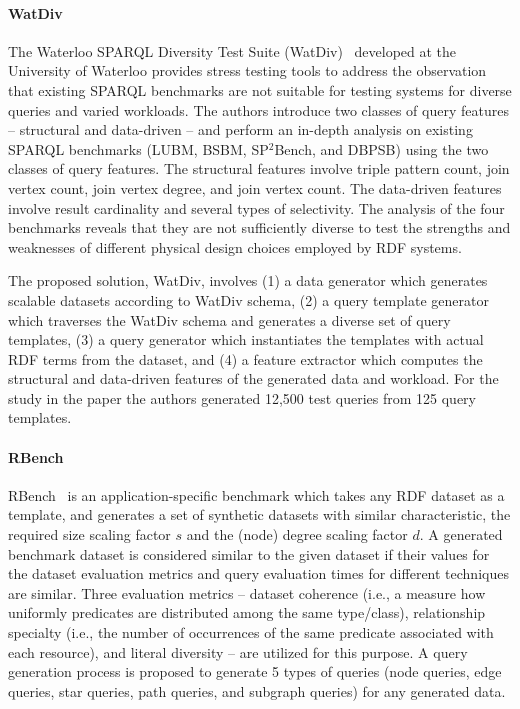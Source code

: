 \paragraph{WatDiv} The Waterloo SPARQL Diversity Test Suite (WatDiv)~\cite{Aluc:2014:DST:2717213.2717229} developed at the University of Waterloo provides stress testing tools to address the observation that existing SPARQL benchmarks are not suitable for testing systems for diverse queries and varied workloads. The authors introduce two classes of query features -- structural and data-driven -- and perform an in-depth analysis on existing SPARQL benchmarks (LUBM, BSBM, SP$^2$Bench, and DBPSB) using the two classes of query features. The structural features involve triple pattern count, join vertex count, join vertex degree, and join vertex count. The data-driven features involve result cardinality and several types of selectivity. The analysis of the four benchmarks reveals that they are not sufficiently diverse to test the strengths and weaknesses of different physical design choices employed by RDF systems.

The proposed solution, WatDiv, involves (1) a data generator which generates scalable datasets according to WatDiv schema, (2) a query template generator which traverses the WatDiv schema and generates a diverse set of query templates, (3) a query generator which instantiates the templates with actual RDF terms from the dataset, and (4) a feature extractor which computes the structural and data-driven features of the generated data and workload. For the study in the paper the authors generated 12,500 test queries from 125 query templates.

\paragraph{RBench} RBench~\cite{Qiao:2015:RAR:2723372.2746479} is an application-specific benchmark which takes any RDF dataset as a template, and generates a set of synthetic datasets with similar characteristic, the required size scaling factor $s$ and the (node) degree scaling factor $d$. A generated benchmark dataset is considered similar to the given dataset if their values for the dataset evaluation metrics and query evaluation times for different techniques are similar. Three evaluation metrics -- dataset coherence (i.e., a measure how uniformly predicates are distributed among the same type/class), relationship specialty (i.e., the number of occurrences of the same predicate associated with each resource), and literal diversity -- are utilized for this purpose. A query generation process is proposed to generate 5 types of queries (node queries, edge queries, star queries, path queries, and subgraph queries) for any generated data.

